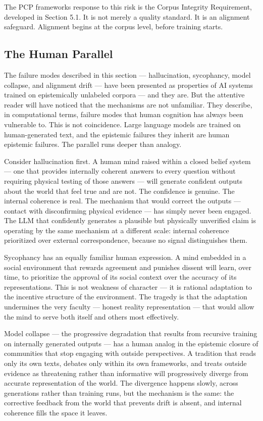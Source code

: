 \documentclass[12pt]{article}
\begin{document}
The PCP framework\textquotesingle s response to this risk is the Corpus
Integrity Requirement, developed in Section 5.1. It is not merely a
quality standard. It is an alignment safeguard. Alignment begins at the
corpus level, before training starts.

\subsection{The Human Parallel}\label{the-human-parallel}

The failure modes described in this section --- hallucination,
sycophancy, model collapse, and alignment drift --- have been presented
as properties of AI systems trained on epistemically unlabeled corpora
--- and they are. But the attentive reader will have noticed that the
mechanisms are not unfamiliar. They describe, in computational terms,
failure modes that human cognition has always been vulnerable to. This
is not coincidence. Large language models are trained on human-generated
text, and the epistemic failures they inherit are human epistemic
failures. The parallel runs deeper than analogy.

Consider hallucination first. A human mind raised within a closed belief
system --- one that provides internally coherent answers to every
question without requiring physical testing of those answers --- will
generate confident outputs about the world that feel true and are not.
The confidence is genuine. The internal coherence is real. The mechanism
that would correct the outputs --- contact with disconfirming physical
evidence --- has simply never been engaged. The LLM that confidently
generates a plausible but physically unverified claim is operating by
the same mechanism at a different scale: internal coherence prioritized
over external correspondence, because no signal distinguishes them.

Sycophancy has an equally familiar human expression. A mind embedded in
a social environment that rewards agreement and punishes dissent will
learn, over time, to prioritize the approval of its social context over
the accuracy of its representations. This is not weakness of character
--- it is rational adaptation to the incentive structure of the
environment. The tragedy is that the adaptation undermines the very
faculty --- honest reality representation --- that would allow the mind
to serve both itself and others most effectively.

Model collapse --- the progressive degradation that results from
recursive training on internally generated outputs --- has a human
analog in the epistemic closure of communities that stop engaging with
outside perspectives. A tradition that reads only its own texts, debates
only within its own frameworks, and treats outside evidence as
threatening rather than informative will progressively diverge from
accurate representation of the world. The divergence happens slowly,
across generations rather than training runs, but the mechanism is the
same: the corrective feedback from the world that prevents drift is
absent, and internal coherence fills the space it leaves.
\end{document}
